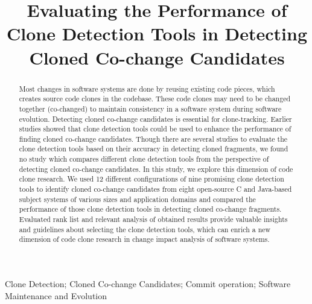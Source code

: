 \documentclass[review]{elsarticle}
\begin{document}
\begin{frontmatter}

\title{Evaluating the Performance of Clone Detection Tools in Detecting Cloned Co-change Candidates}


\begin{abstract}
Most changes in software systems are done by reusing existing code pieces, which creates source code clones in the codebase. These code clones may need to be changed together (co-changed) to maintain consistency in a software system during software evolution. Detecting cloned co-change candidates is essential for clone-tracking. Earlier studies showed that clone detection tools could be used to enhance the performance of finding cloned co-change candidates. Though there are several studies to evaluate the clone detection tools based on their accuracy in detecting cloned fragments, we found no study which compares different clone detection tools from the perspective of detecting cloned co-change candidates. In this study, we explore this dimension of code clone research. We used 12 different configurations of nine promising clone detection tools to identify cloned co-change candidates from eight open-source C and Java-based subject systems of various sizes and application domains and compared the performance of those clone detection tools in detecting cloned co-change fragments. Evaluated rank list and relevant analysis of obtained results provide valuable insights and guidelines about selecting the clone detection tools, which can enrich a new dimension of code clone research in change impact analysis of software systems.  
\end{abstract}

\begin{keyword}
Clone Detection; Cloned Co-change Candidates; Commit operation; Software Maintenance and Evolution
\end{keyword}

\end{frontmatter}

\linenumbers
\end{document}
